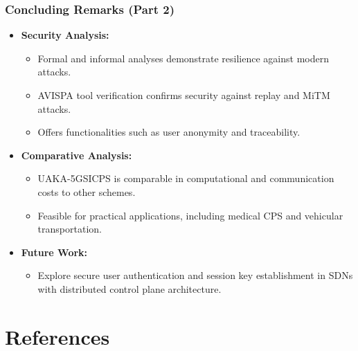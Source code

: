 \documentclass[9pt,handout]{beamer}
\begin{document}
\begin{frame}
    \frametitle{Concluding Remarks (Part 2)}
    \begin{itemize}
        \item \textbf{Security Analysis:}
        \begin{itemize}
            \item Formal and informal analyses demonstrate resilience against modern attacks.
            \item AVISPA tool verification confirms security against replay and MiTM attacks.
            \item Offers functionalities such as user anonymity and traceability.
        \end{itemize}
        \item \textbf{Comparative Analysis:}
        \begin{itemize}
            \item UAKA-5GSICPS is comparable in computational and communication costs to other schemes.
            \item Feasible for practical applications, including medical CPS and vehicular transportation.
        \end{itemize}
        \item \textbf{Future Work:}
        \begin{itemize}
            \item Explore secure user authentication and session key establishment in SDNs with distributed control plane architecture.
        \end{itemize}
    \end{itemize}
\end{frame}

\section*{References}



\end{document}
